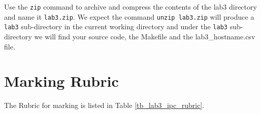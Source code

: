 \begin{enumerate}
\end{enumerate}
Use the \verb+zip+ command to archive and compress the contents of the lab3 directory and name it \verb+lab3.zip+. We expect the command \verb+unzip lab3.zip+ will produce a \verb+lab3+ sub-directory in the current working directory and under the \verb+lab3+ sub-directory we will find your source code, the Makefile and the lab3\_hostname.csv file.

\section{Marking Rubric}
The Rubric for marking is listed in Table \ref{tb_lab3_ipc_rubric}.

